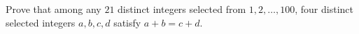 Prove that among any $21$ distinct integers selected from $1,2,\ldots,100$, four distinct selected integers $a,b,c,d$ satisfy $a+b=c+d$.
